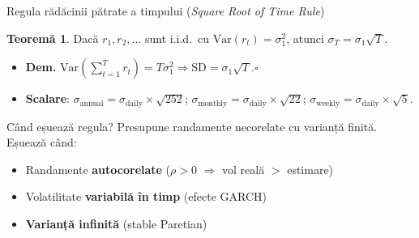 \documentclass[9pt, aspectratio=169, t]{beamer}
\theoremstyle{definition}
\newtheorem{thm}{Teoremă}
\newcommand{\Var}{\text{Var}}
\begin{document}
\begin{frame}[shrink=3]{Regula rădăcinii pătrate a timpului (\textit{Square Root of Time Rule})}
\begin{thm}
Dacă $r_1, r_2, \ldots$ sunt i.i.d.\ cu $\Var(r_t) = \sigma_1^2$, atunci $\sigma_T = \sigma_1 \sqrt{T}.$
\end{thm}
\vspace{-0.15cm}
\begin{itemize}\footnotesize\setlength{\itemsep}{0pt}
    \item \textbf{Dem.}\; $\Var(\sum_{t=1}^T r_t) = T\sigma_1^2 \Rightarrow \text{SD} = \sigma_1\sqrt{T}$.\hfill$\square$
    \item \textbf{Scalare}: $\sigma_{\text{annual}} = \sigma_{\text{daily}} \!\times\! \sqrt{252}$;\; $\sigma_{\text{monthly}} = \sigma_{\text{daily}} \!\times\! \sqrt{22}$;\; $\sigma_{\text{weekly}} = \sigma_{\text{daily}} \!\times\! \sqrt{5}$.
\end{itemize}
\vspace{0.02cm}
\begin{alertblock}{Când eșuează regula?}
\footnotesize
Presupune randamente necorelate cu varianță finită. Eșuează când:
\begin{itemize}\setlength{\itemsep}{0pt}
    \item Randamente \textbf{autocorelate} ($\rho > 0$ $\Rightarrow$ vol reală $>$ estimare)
    \item Volatilitate \textbf{variabilă în timp} (efecte GARCH)
    \item \textbf{Varianță infinită} (stable Paretian)
\end{itemize}
\end{alertblock}
\end{frame}
\end{document}
